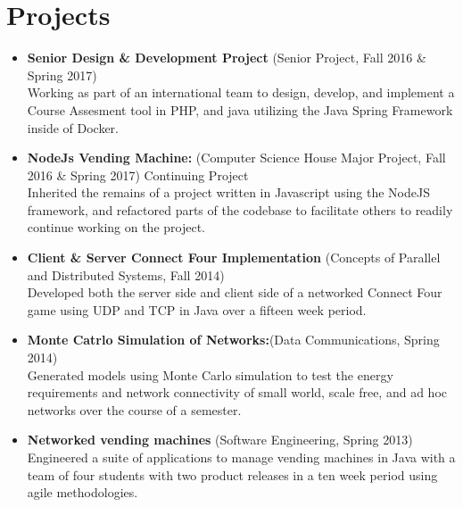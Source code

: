 \documentclass[10pt]{Article}
\begin{document}
\section*{Projects}
\begin{itemize}[topsep=1ex, itemsep=.5ex, parsep=0ex, partopsep=.75ex]
	\item[] {\bf Senior Design \& Development Project} (Senior Project, Fall 2016 \& Spring 2017)\\
	Working as part of an international team to design, develop, and implement a Course Assesment tool in PHP, and java utilizing the Java Spring Framework inside of Docker.
	\item[] {\bf NodeJs Vending Machine:} (Computer Science House Major Project, Fall 2016 \& Spring 2017) Continuing Project\\
	Inherited the remains of a project written in Javascript using the NodeJS framework, and refactored parts of the codebase to facilitate others to readily continue working on the project.
	\item[] {\bf Client \& Server Connect Four Implementation} (Concepts of Parallel and Distributed Systems, Fall 2014)\\
  Developed both the server side and client side of a networked Connect Four game using UDP and TCP in Java over a fifteen week period.
	\item[] {\bf Monte Catrlo Simulation of Networks:}(Data Communications, Spring 2014)\\
	Generated models using Monte Carlo simulation to test the energy requirements and network connectivity of small world, scale free, and ad hoc networks over the course of a semester.
	\item[] {\bf Networked vending machines} (Software Engineering, Spring 2013)\\
	Engineered a suite of applications to manage vending machines in Java with a team of four students with two product releases in a ten week period using agile methodologies.
\end{itemize}
\end{document}
